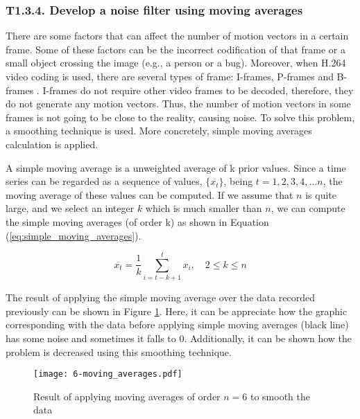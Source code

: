\subsubsection{T1.3.4. Develop a noise filter using moving averages}
There are some factors that can affect the number of motion vectors in a certain frame. Some of these factors can be the incorrect codification of that frame or a small object crossing the image (e.g., a person or a bug). Moreover, when H.264 video coding is used, there are several types of frame: I-frames, P-frames and B-frames . I-frames do not require other video frames to be decoded, therefore, they do not generate any motion vectors. Thus, the number of motion vectors in some frames is not going to be close to the reality, causing noise. To solve this problem, a smoothing technique is used. More concretely, simple moving averages calculation is applied.

A simple moving average \cite{Smi15} is a unweighted average of k prior values. Since a time series can be regarded as a sequence of values, $\{\overline {x_{t}}\}$, being $t=1,2,3,4,…n$, the moving average of these values can be computed. If we assume that $n$ is quite large, and we select an integer $k$ which is much smaller than $n$, we can compute the simple moving averages (of order k) as shown in Equation (\ref{eq:simple_moving_averages}).

\begin{equation} \label{eq:simple_moving_averages}
\overline { { x }_{ t } } =\frac { 1 }{ k } \sum _{ i=t-k+1 }^{ t }{ { x }_{ i } } ,\quad 2\le k\le n
\end{equation}

The result of applying the simple moving average over the data recorded previously can be shown in Figure \ref{fig:6-moving_averages}. Here, it can be appreciate how the graphic corresponding with the data before applying simple moving averages (black line) has some noise and sometimes it falls to 0. Additionally, it can be shown how the problem is decreased using this smoothing technique.

\begin{figure}[!h]
	\begin{center}
		\texttt{[image: 6-moving\_averages.pdf]}
		\caption{Result of applying moving averages of order $n = 6$ to smooth the data}
		\label{fig:6-moving_averages}
	\end{center}
\end{figure}


